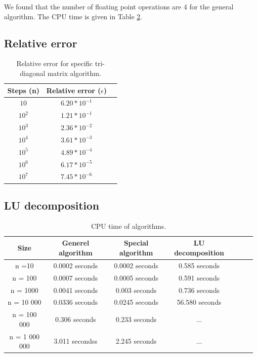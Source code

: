 \documentclass[norsk,a4paper,12pt]{article}
\begin{document}
We found that the number of floating point operations are 4 for the general algorithm. The CPU time is given in Table \ref{tab:LU}.

 \subsection{Relative error}
 
  \begin{table}[H]
\begin{center}
\caption{Relative error for specific tri-diagonal matrix algorithm.}
\begin{tabular}{ |c|c|c| } \hline
Steps (n)&Relative error ($\epsilon$) \\ \hline
$10$&$6.20*10^{-1}$ \\ \hline
$10^2$&$1.21*10^{-1}$ \\ \hline
$10^3$&$2.36*10^{-2}$ \\ \hline
$10^4$&$3.61*10^{-3}$ \\ \hline
$10^5$&$4.89*10^{-4}$ \\ \hline
$10^6$&$6.17*10^{-5}$ \\ \hline
$10^7$&$7.45*10^{-6}$ \\ \hline
\end{tabular}
\label{tab:e}
\end{center}
\end{table}

 \subsection{LU decomposition}
 
   \begin{table}[H]
\begin{center}
\caption{CPU time of algorithms.}
\begin{tabular}{ |c|c|c|clcl } \hline
Size & Generel algorithm& Special algorithm& LU decomposition \\ \hline
n =10 & 0.0002 seconds &0.0002 seconds&0.585 seconds\\ \hline
n = 100 & 0.0007 seconds   &0.0005  seconds& 0.591 seconds\\ \hline
n = 1000 &0.0041 seconds &0.003 seconds& 0.736 seconds\\ \hline
n = 10 000    &0.0336 seconds&0.0245  seconds&56.580 seconds\\ \hline
n = 100 000& 0.306 seconds &0.233 seconds& ...\\ \hline
n = 1 000 000 & 3.011 secondss &2.245 seconds&...\\ \hline
\end{tabular}
\label{tab:LU}
\end{center}
\end{table}
\end{document}
